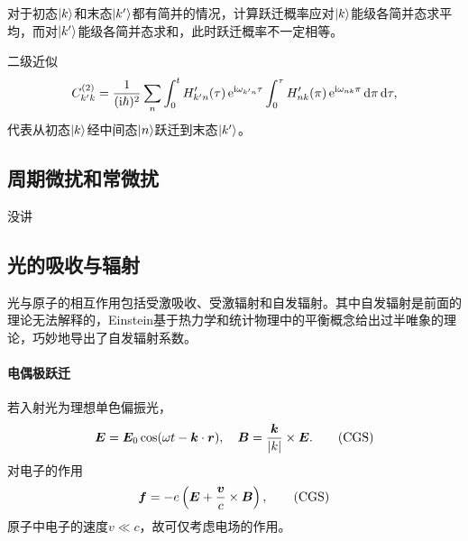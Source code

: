 对于初态$\left\vert k\right\rangle$和末态$\left\vert k'\right\rangle$都有简并的情况，计算跃迁概率应对$\left\vert k\right\rangle$能级各简并态求平均，而对$\left\vert k'\right\rangle$能级各简并态求和，此时跃迁概率不一定相等。

二级近似
\[
C_{k'k}^{(2)}=\frac1{(\mathrm{i}\hbar)^2}\sum_n\int_0^tH'_{k'n}(\tau)\mathop{}\!\mathrm{e}^{\mathrm{i}\omega_{k'n}\tau}\int_0^\tau H'_{nk}(\pi)\mathop{}\!\mathrm{e}^{\mathrm{i}\omega_{nk}\pi}\mathop{}\!\mathrm{d}\pi\mathop{}\!\mathrm{d}\tau,
\]
代表从初态$\left\vert k\right\rangle$经中间态$\left\vert n\right\rangle$跃迁到末态$\left\vert k'\right\rangle$。
\subsection{周期微扰和常微扰}
没讲
\subsection{光的吸收与辐射}
光与原子的相互作用包括受激吸收、受激辐射和自发辐射。其中自发辐射是前面的理论无法解释的，Einstein基于热力学和统计物理中的平衡概念给出过半唯象的理论，巧妙地导出了自发辐射系数。
\paragraph*{电偶极跃迁}若入射光为理想单色偏振光，
\[
	\bm E=\bm E_0\cos(\omega t-\bm k\cdot\bm r),\quad\bm B=\frac{\bm k}{\abs k}\times\bm E.\CGS
\]
对电子的作用 
\[
	\bm f=-e\kh{\bm E+\frac{\bm v}c\times\bm B},\CGS
\]
原子中电子的速度$v\ll c$，故可仅考虑电场的作用。

